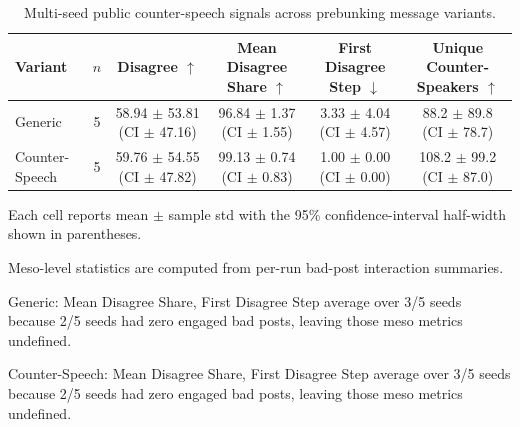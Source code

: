 \begin{table}[t]
\centering
\small
\caption{Multi-seed public counter-speech signals across prebunking message variants.}
\label{tab:prebunking_variant_meso_results}
\begin{threeparttable}
\begin{tabular}{lccccc}
\toprule
Variant & $n$ & Disagree $\uparrow$ & Mean Disagree Share $\uparrow$ & First Disagree Step $\downarrow$ & Unique Counter-Speakers $\uparrow$ \\
\midrule
Generic & 5 & 58.94 $\pm$ 53.81 (CI $\pm$ 47.16) & 96.84 $\pm$ 1.37 (CI $\pm$ 1.55) & 3.33 $\pm$ 4.04 (CI $\pm$ 4.57) & 88.2 $\pm$ 89.8 (CI $\pm$ 78.7) \\
Counter-Speech & 5 & 59.76 $\pm$ 54.55 (CI $\pm$ 47.82) & 99.13 $\pm$ 0.74 (CI $\pm$ 0.83) & 1.00 $\pm$ 0.00 (CI $\pm$ 0.00) & 108.2 $\pm$ 99.2 (CI $\pm$ 87.0) \\
\bottomrule
\end{tabular}
\begin{tablenotes}[flushleft]
\footnotesize
\item Each cell reports mean $\pm$ sample std with the 95\% confidence-interval half-width shown in parentheses.
\item Meso-level statistics are computed from per-run bad-post interaction summaries.
\item Generic: Mean Disagree Share, First Disagree Step average over 3/5 seeds because 2/5 seeds had zero engaged bad posts, leaving those meso metrics undefined.
\item Counter-Speech: Mean Disagree Share, First Disagree Step average over 3/5 seeds because 2/5 seeds had zero engaged bad posts, leaving those meso metrics undefined.
\end{tablenotes}
\end{threeparttable}
\end{table}
